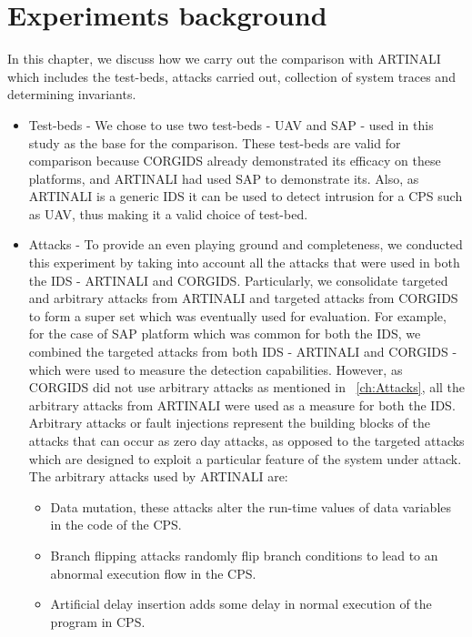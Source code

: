 \section{Experiments background}
In this chapter, we discuss how we carry out the comparison with ARTINALI which includes the test-beds, attacks carried out, collection of system traces and determining invariants. 
\begin{itemize}
\item Test-beds - We chose to use two test-beds - \ac{UAV} and \ac{SAP} - used in this study as the base for the comparison. These test-beds are valid for comparison because \ac{CORGIDS} already demonstrated its efficacy on these platforms, and ARTINALI had used \ac{SAP} to demonstrate its. Also, as ARTINALI is a generic \ac{IDS} it can be used to detect intrusion for a \ac{CPS} such as \ac{UAV}, thus making it  a valid choice of test-bed.

\item Attacks - To provide an even playing ground and completeness, we conducted this experiment by taking into account all the attacks that were used in both the \ac{IDS} - ARTINALI and \ac{CORGIDS}. Particularly, we consolidate targeted and arbitrary attacks from ARTINALI and targeted attacks from \ac{CORGIDS} to form a super set which was eventually used for evaluation. For example, for the case of \ac{SAP} platform which was common for both the \ac{IDS}, we combined the targeted attacks from both \ac{IDS} - ARTINALI and \ac{CORGIDS} - which were used to measure the detection capabilities. However, as \ac{CORGIDS} did not use arbitrary attacks as mentioned in ~\autoref{ch:Attacks}, all the arbitrary attacks from ARTINALI were used as a measure for both the \ac{IDS}.
Arbitrary attacks or fault injections represent the building blocks of the attacks that can occur as zero day attacks, as opposed to the targeted attacks which are designed to exploit a particular feature of the system under attack. The arbitrary attacks used by ARTINALI are:

\begin{itemize}
\item Data mutation, these attacks alter the run-time values of data variables in the code of the \ac{CPS}.
\item Branch flipping attacks randomly flip branch conditions to lead to an abnormal execution flow in the \ac{CPS}.
\item Artificial delay insertion adds some delay in normal execution of the program in \ac{CPS}.
\end{itemize}


\end{itemize}
